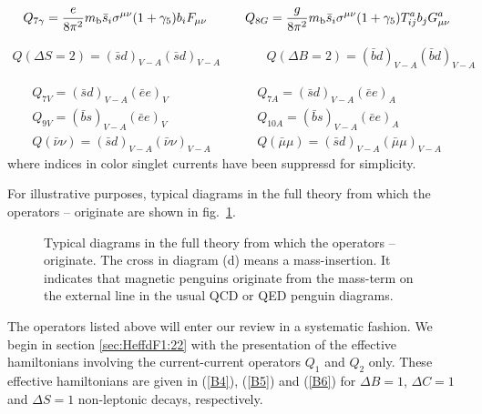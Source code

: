 
\begin{eqnarray}
Q_{7\gamma} = \frac{e}{8\pi^2} m_{\rm b} \bar{s}_i \sigma^{\mu\nu}
              (1+\gamma_5) b_i F_{\mu\nu}
&\qquad&
Q_{8G} = \frac{g}{8\pi^2} m_{\rm b} \bar{s}_i \sigma^{\mu\nu}
        (1+\gamma_5)T^a_{ij} b_j G^a_{\mu\nu}
\label{eq:Q78mag}
\end{eqnarray}

\begin{eqnarray}
Q(\Delta S=2) = (\bar s d)_{V-A} (\bar s d)_{V-A} 
&\qquad&
Q(\Delta B=2) = (\bar b d)_{V-A} (\bar b d)_{V-A} 
\label{eq:QdSB2}
\end{eqnarray}


\begin{eqnarray}
Q_{7V}  = (\bar s d)_{V-A} (\bar e e)_{V} 
&\qquad&
Q_{7A} = (\bar s d)_{V-A} (\bar e e)_{A}
\label{eq:Q7V7A} \\
Q_{9V}  = (\bar b s)_{V-A} (\bar e e)_{V} 
&\qquad&
Q_{10A} = (\bar b s)_{V-A} (\bar e e)_{A}
\label{eq:Q9V10A} \\
Q(\bar\nu \nu) = (\bar s d)_{V-A} (\bar \nu \nu)_{V-A} 
&\qquad&
Q(\bar\mu \mu) = (\bar s d)_{V-A} (\bar \mu \mu)_{V-A} 
\label{eq:Qnnmm}
\end{eqnarray}
where indices in color singlet currents have been suppressd for
simplicity.

For illustrative purposes, typical diagrams in the full theory from
which the operators -- originate are shown in
fig.\ \ref{fig:oporig}.

\begin{figure}[htb]
\vspace{0.10in}
\centerline{
\epsfysize=5in
}
\vspace{0.08in}
\caption[]{Typical diagrams in the full theory from which the operators
-- originate.  The cross in diagram (d) means
a mass-insertion. It indicates that magnetic penguins originate from
the mass-term on the external line in the usual QCD or QED penguin
diagrams.
\label{fig:oporig}}
\end{figure}

The operators listed above will enter our review in a systematic
fashion. We begin in section \ref{sec:HeffdF1:22} with the presentation
of the effective hamiltonians involving the current-current operators
$Q_1$ and $Q_2$ only.  These effective hamiltonians are given in
(\ref{B4}), (\ref{B5}) and (\ref{B6}) for $\Delta B=1$, $\Delta C=1$
and $\Delta S=1$ non-leptonic decays, respectively.

